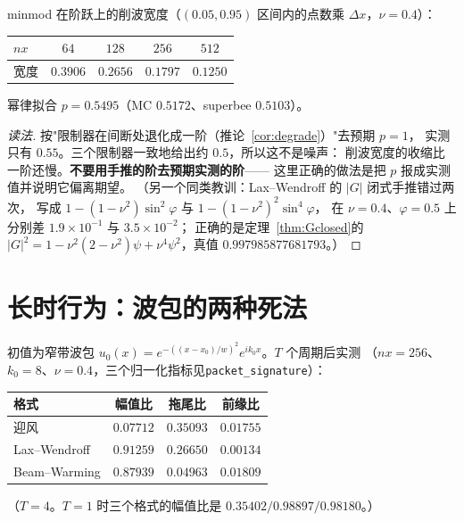 \begin{theorem}[限制器不免费]
\label{thm:notfree}
minmod 在阶跃上的削波宽度（$(0.05,0.95)$ 区间内的点数乘 $\Delta x$，$\nu=0.4$）：

\begin{center}
\begin{tabular}{lcccc}
\hline
$nx$ & $64$ & $128$ & $256$ & $512$\\
\hline
宽度 & $0.3906$ & $0.2656$ & $0.1797$ & $0.1250$\\
\hline
\end{tabular}
\end{center}

幂律拟合 $p=0.5495$（MC $0.5172$、superbee $0.5103$）。
\end{theorem}

\begin{proof}[读法]
按"限制器在间断处退化成一阶（推论~\ref{cor:degrade}）"去预期 $p=1$，
实测只有 $0.55$。三个限制器一致地给出约 $0.5$，所以这不是噪声：
削波宽度的收缩比一阶还慢。\textbf{不要用手推的阶去预期实测的阶}——
这里正确的做法是把 $p$ 报成实测值并说明它偏离期望。
（另一个同类教训：Lax--Wendroff 的 $|G|$ 闭式手推错过两次，
写成 $1-(1-\nu^2)\sin^2\varphi$ 与 $1-(1-\nu^2)^2\sin^4\varphi$，
在 $\nu=0.4$、$\varphi=0.5$ 上分别差 $1.9\times10^{-1}$ 与 $3.5\times10^{-2}$；
正确的是定理~\ref{thm:Gclosed}的
$|G|^2=1-\nu^2(2-\nu^2)\psi+\nu^4\psi^2$，真值 $0.997985877681793$。）
\end{proof}

\section{长时行为：波包的两种死法}

\begin{theorem}[包络的两条命运]
\label{thm:packet}
初值为窄带波包 $u_0(x)=e^{-((x-x_0)/w)^2}e^{ik_0x}$。$T$ 个周期后实测
（$nx=256$、$k_0=8$、$\nu=0.4$，三个归一化指标见\texttt{packet\_signature}）：

\begin{center}
\begin{tabular}{lccc}
\hline
格式 & 幅值比 & 拖尾比 & 前缘比\\
\hline
迎风 & $0.07712$ & $0.35093$ & $0.01755$\\
Lax--Wendroff & $0.91259$ & $0.26650$ & $0.00134$\\
Beam--Warming & $0.87939$ & $0.04963$ & $0.01809$\\
\hline
\end{tabular}
\end{center}

（$T=4$。$T=1$ 时三个格式的幅值比是 $0.35402/0.98897/0.98180$。）
\end{theorem}


